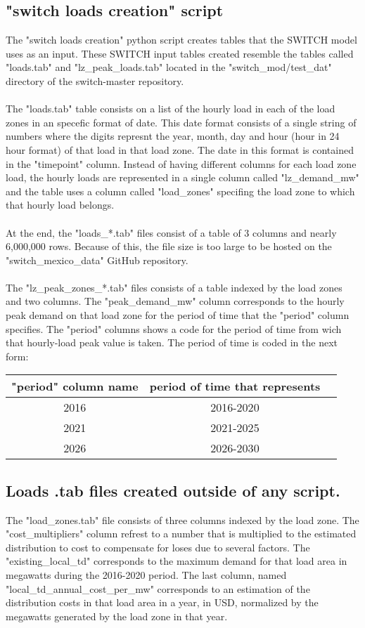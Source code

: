 \documentclass{article}
\begin{document}
\subsection{"switch loads creation" script}
The "switch loads creation" python script creates tables that the SWITCH model uses as an input. These SWITCH input tables created resemble the tables called "loads.tab" and "lz\_peak\_loads.tab" located in the "switch\_mod/test\_dat" directory of the switch-master repository.
\\
\\The "loads.tab" table consists on a list of the hourly load in each of the load zones in an specefic format of date. This date format consists of a single string of numbers where the digits represnt the year, month, day and hour (hour in 24 hour format) of that load in that load zone. The date in this  format is contained in the "timepoint" column. Instead of having different columns for each load zone load, the hourly loads are represented in a single column called "lz\_demand\_mw" and the table uses a column called "load\_zones" specifing the load zone to which that hourly load belongs.
\\
\\At the end, the "loads\_*.tab" files consist of a table of 3 columns and nearly 6,000,000 rows. Because of this, the file size is too large to be hosted on the "switch\_mexico\_data" GitHub repository.
\\
\\The "lz\_peak\_zones\_*.tab" files consists of a table indexed by the load zones and two columns. The "peak\_demand\_mw" column corresponds to the hourly peak demand on that load zone for the period of time that the "period" column specifies. The "period" columns shows a code for the period of time from wich that hourly-load peak value is taken. The period of time is coded in the next form:
\begin{table}[h!]
\centering
\begin{tabular}{ | c| c| c| }
\hline
"period" column name & period of time that represents \\
\hline
2016 & 2016-2020 \\ \hline
2021 & 2021-2025 \\ \hline
2026 & 2026-2030 \\ \hline
\end{tabular} 
\end{table}
\subsection{Loads .tab files created outside of any script.}
  
The "load\_zones.tab" file consists of three columns indexed by the load zone. The "cost\_multipliers" column refrest to a number that is multiplied to the estimated distribution to cost to compensate for loses due to several factors. The "existing\_local\_td" corresponds to the maximum demand for that load area in megawatts during the 2016-2020 period. The last column, named "local\_td\_annual\_cost\_per\_mw" corresponds to an estimation of the distribution costs in that load area in a year, in USD, normalized by the megawatts generated by the load zone in that year.
\end{document}
